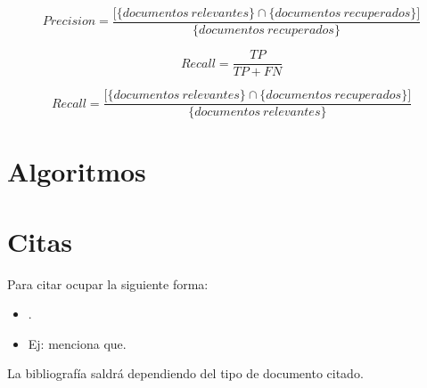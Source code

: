 \begin{equation}
	Precision = \frac{\big[\big\{documentos \ relevantes\big\} \cap \big\{documentos \ recuperados\big\}\big]}{\big\{documentos \ recuperados\big\}}
\end{equation}

\begin{equation}
	Recall = \frac{TP}{TP+ FN}
\end{equation}

\begin{equation}
	Recall = \frac{\big[\big\{documentos \ relevantes\big\} \cap \big\{documentos \ recuperados\big\}\big]}{\big\{documentos \ relevantes\big\}}
\end{equation}

\section{Algoritmos}

\begin{algorithm}[hbt]
	\caption{Escribiendo algoritmos usando \LaTeX2e}
	\SetAlgoLined
\end{algorithm}

\section{Citas}

Para citar ocupar la siguiente forma: 

\begin{itemize}
	\item \cite{Codishetal2000}.
	\item Ej: \textcite{Codishetal2000} menciona que.
\end{itemize}

La bibliografía saldrá dependiendo del tipo de documento citado.


